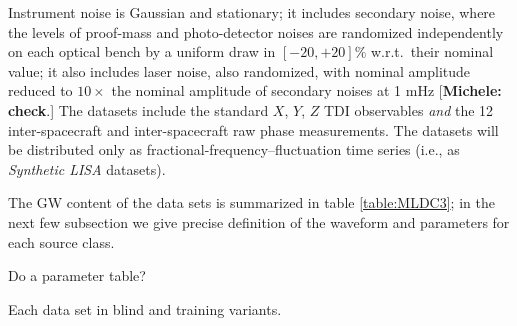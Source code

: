 \documentclass{iopart}
\begin{document}
Instrument noise is Gaussian and stationary; it includes secondary noise, where the levels of proof-mass and photo-detector noises are randomized independently on each optical bench by a uniform draw in $[-20,+20]\%$ w.r.t.\ their nominal value; it also includes laser noise, also randomized, with nominal amplitude reduced to $10\times$ the nominal amplitude of secondary noises at 1 mHz [\textbf{Michele: check}.] The datasets include the standard $X$, $Y$, $Z$ TDI observables \emph{and} the 12 inter-spacecraft and inter-spacecraft raw phase measurements. The datasets will be distributed only as fractional-frequency--fluctuation time series (i.e., as \emph{Synthetic LISA} datasets).


The GW content of the data sets is summarized in table \ref{table:MLDC3}; in the next few subsection we give precise definition of the waveform and parameters for each source class.

Do a parameter table?

Each data set in blind and training variants.
\end{document}
